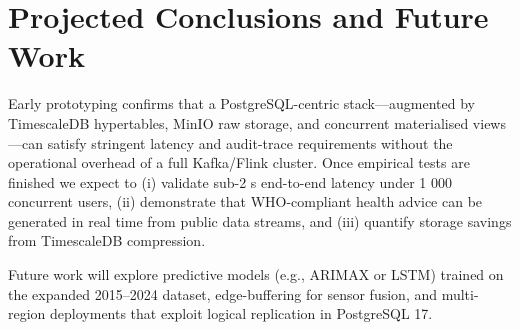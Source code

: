 \section{Projected Conclusions and Future Work}\label{sec:conclusion}
Early prototyping confirms that a PostgreSQL-centric stack—augmented by TimescaleDB hypertables, MinIO raw storage, and concurrent materialised views—can satisfy stringent latency and audit-trace requirements without the operational overhead of a full Kafka/Flink cluster.  
Once empirical tests are finished we expect to (i) validate sub-2 s end-to-end latency under 1 000 concurrent users, (ii) demonstrate that WHO-compliant health advice can be generated in real time from public data streams, and (iii) quantify storage savings from TimescaleDB compression.  

Future work will explore predictive models (e.g., ARIMAX or LSTM) trained on the expanded 2015–2024 dataset, edge-buffering for sensor fusion, and multi-region deployments that exploit logical replication in PostgreSQL 17.  

